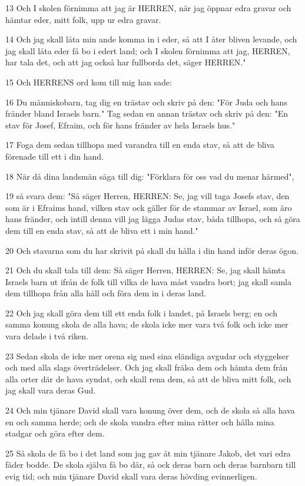 \par 13 Och I skolen förnimma att jag är HERREN, när jag öppnar edra gravar och hämtar eder, mitt folk, upp ur edra gravar.
\par 14 Och jag skall låta min ande komma in i eder, så att I åter bliven levande, och jag skall låta eder få bo i edert land; och I skolen förnimma att jag, HERREN, har tala det, och att jag också har fullborda det, säger HERREN."
\par 15 Och HERRENS ord kom till mig han sade:
\par 16 Du människobarn, tag dig en trästav och skriv på den: "För Juda och hans fränder bland Israels barn." Tag sedan en annan trästav och skriv på den: "En stav för Josef, Efraim, och för hans fränder av hela Israels hus."
\par 17 Foga dem sedan tillhopa med varandra till en enda stav, så att de bliva förenade till ett i din hand.
\par 18 När då dina landsmän säga till dig: "Förklara för oss vad du menar härmed",
\par 19 så svara dem: "Så säger Herren, HERREN: Se, jag vill taga Josefs stav, den som är i Efraims hand, vilken stav ock gäller för de stammar av Israel, som äro hans fränder, och intill denna vill jag lägga Judas stav, båda tillhopa, och så göra dem till en enda stav, så att de bliva ett i min hand."
\par 20 Och stavarna som du har skrivit på skall du hålla i din hand inför deras ögon.
\par 21 Och du skall tala till dem: Så säger Herren, HERREN: Se, jag skall hämta Israels barn ut ifrån de folk till vilka de hava måst vandra bort; jag skall samla dem tillhopa från alla håll och föra dem in i deras land.
\par 22 Och jag skall göra dem till ett enda folk i landet, på Israels berg; en och samma konung skola de alla hava; de skola icke mer vara två folk och icke mer vara delade i två riken.
\par 23 Sedan skola de icke mer orena sig med sina eländiga avgudar och styggelser och med alla slags överträdelser. Och jag skall frälsa dem och hämta dem från alla orter där de hava syndat, och skall rena dem, så att de bliva mitt folk, och jag skall vara deras Gud.
\par 24 Och min tjänare David skall vara konung över dem, och de skola så alla hava en och samma herde; och de skola vandra efter mina rätter och hålla mina stadgar och göra efter dem.
\par 25 Så skola de få bo i det land som jag gav åt min tjänare Jakob, det vari edra fäder bodde. De skola själva få bo där, så ock deras barn och deras barnbarn till evig tid; och min tjänare David skall vara deras hövding evinnerligen.
